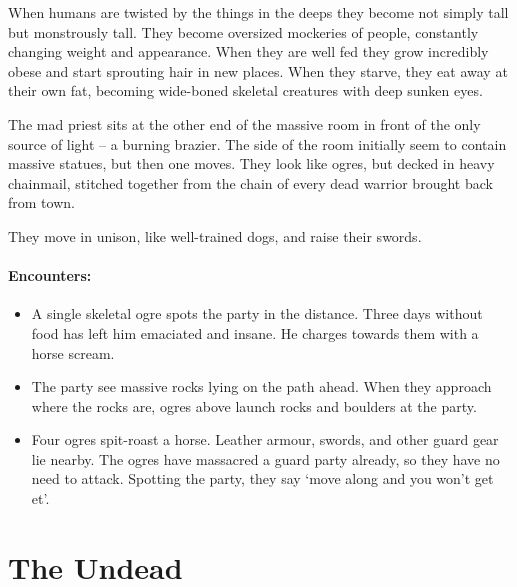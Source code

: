 \begin{multicols}{2}
When humans are twisted by the things in the deeps they become not simply tall but monstrously tall.
They become oversized mockeries of people, constantly changing weight and appearance.
When they are well fed they grow incredibly obese and start sprouting hair in new places.
When they starve, they eat away at their own fat, becoming wide-boned skeletal creatures with deep sunken eyes.


\begin{boxtext}

  The mad priest sits at the other end of the massive room in front of the only source of light -- a burning brazier.
  The side of the room initially seem to contain massive statues, but then one moves.
  They look like ogres, but decked in heavy chainmail, stitched together from the chain of every dead warrior brought back from town.

  They move in unison, like well-trained dogs, and raise their swords.

\end{boxtext}

\paragraph{Encounters:}

\begin{itemize}

  \item
  A single skeletal ogre spots the party in the distance.
  Three days without food has left him emaciated and insane.
  He charges towards them with a horse scream.
  \item
  The party see massive rocks lying on the path ahead.
  When they approach where the rocks are, ogres above launch rocks and boulders at the party.
  \item
  Four ogres spit-roast a horse.
  Leather armour, swords, and other \gls{guard} gear lie nearby.
  The ogres have massacred a \gls{guard} party already, so they have no need to attack.
  Spotting the party, they say `move along and you won't get et'.

\end{itemize}

\end{multicols}

\section{The Undead}

